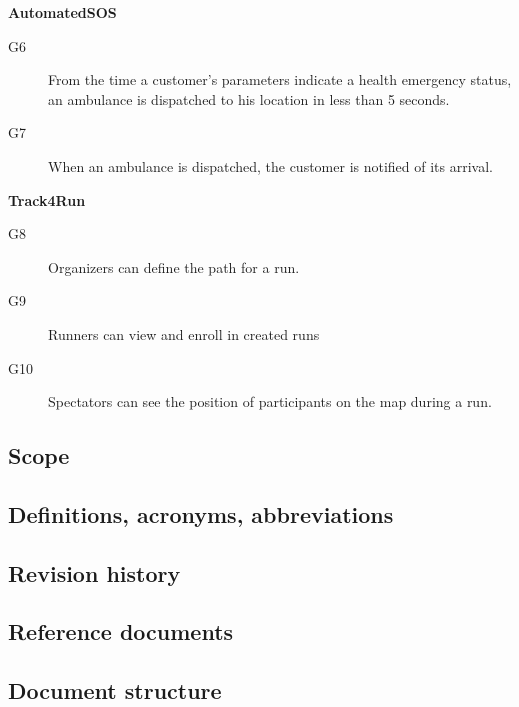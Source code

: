 \documentclass[../main.tex]{subfiles}
\begin{document}
{\bf AutomatedSOS}
\begin{description}
	\item [G6]  From the time a customer's parameters indicate a health emergency status, an ambulance is dispatched to his location in less than 5 seconds.
	\item [G7]  When an ambulance is dispatched, the customer is notified of its arrival.
\end{description}

{\bf Track4Run}
\begin{description}
	\item [G8]  Organizers can define the path for a run.
	\item [G9]  Runners can view and enroll in created runs
	\item [G10] Spectators can see the position of participants on the map during a run.
\end{description}

\subsection{Scope}
\subsection{Definitions, acronyms, abbreviations}
\subsection{Revision history}
\subsection{Reference documents}
\subsection{Document structure}
\end{document}
